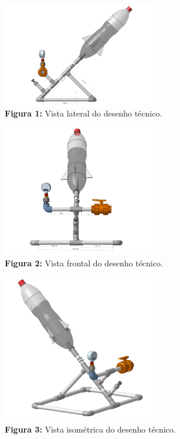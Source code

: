 \begin{center}
    \includegraphics[width=0.5\textwidth]{figuras/vista_lateral.png}
    \\\textbf{Figura 1:} Vista lateral do desenho técnico.
\end{center}

\begin{center}
    \includegraphics[width=0.5\textwidth]{figuras/vista_frontal.png}
    \\\textbf{Figura 2:} Vista frontal do desenho técnico.
\end{center}

\begin{center}
    \includegraphics[width=0.5\textwidth]{figuras/vista_isometrica.png}
    \\\textbf{Figura 3:} Vista isométrica do desenho técnico.
\end{center}

